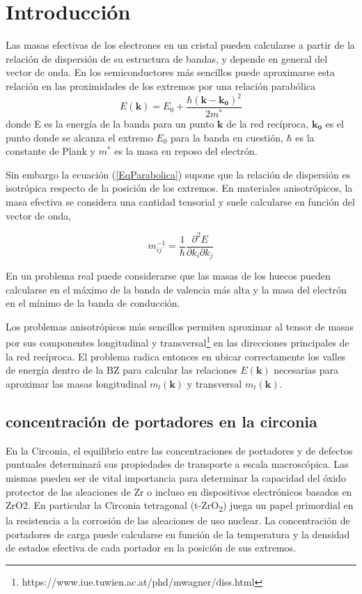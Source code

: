 \section{Introducción}
Las masas efectivas de los electrones en un cristal pueden calcularse
a partir de la relación de dispersión de su estructura de bandas, y depende 
en general del vector de onda. En los
semiconductores más sencillos puede aproximarse esta relación 
en las proximidades de los extremos por una
relación parabólica
\begin{equation}\label{EqParabolica}
  E(\mathbf{k}) = E_0 + \dfrac{\hbar (\mathbf{k}-\mathbf{k_0})^2}{2 m^{*}}
\end{equation}
donde E es la energía de la banda para un punto $\mathbf{k}$ de la red recíproca, $\mathbf{k_0}$
es 
el punto donde se alcanza el extremo $E_0$ para la banda en cuestión, $\hbar$ es la constante de 
Plank y $m^{*}$ es la masa en reposo del electrón. 

Sin embargo la ecuación (\ref{EqParabolica}) supone que la relación de dispersión es
isotrópica respecto de la posición 
de los extremos. En materiales anisotrópicos, la masa efectiva se considera una cantidad
tensorial y suele calcularse en función del vector de onda,

\begin{equation}\label{EqTensorDefinition}
  m_{ij}^{-1} = \frac{1}{\hbar}\dfrac{\partial^2 E}{\partial k_i  \partial k_j}
\end{equation}

En un problema real puede considerarse que las masas de los huecos pueden calcularse
en el máximo de la banda de valencia más alta y la masa del electrón en el mínimo de la banda
de conducción. 

Los problemas anisotrópicos más sencillos permiten aproximar al tensor de masas por sus
componentes longitudinal y transversal\footnote{ https://www.iue.tuwien.ac.at/phd/mwagner/diss.html}
en las direcciones principales de la red recíproca. 
El problema radica entonces en ubicar correctamente los valles de energía dentro de la BZ
para calcular las relaciones $E(\mathbf{k})$ necesarias para aproximar las masas longitudinal 
$m_l(\mathbf{k})$ y transversal $m_t(\mathbf{k})$.

\subsection{concentración de portadores en la circonia}

En la Circonia, el equilibrio entre las  concentraciones de portadores 
y de defectos puntuales determinará sus propiedades de transporte a escala macroscópica.  Las
mismas pueden ser de vital importancia para determinar la capacidad del óxido protector
de las aleaciones de Zr o incluso en dispositivos electrónicos basados en ZrO2. En particular
la Circonia tetragonal (t-ZrO\textsubscript{2}) juega un papel primordial en la resistencia
a la corrosión de las aleaciones de uso nuclear. 
La concentración de portadores de carga puede calcularse en función de la temperatura y la densidad
de estados efectiva de cada portador en la posición de sus extremos. 

